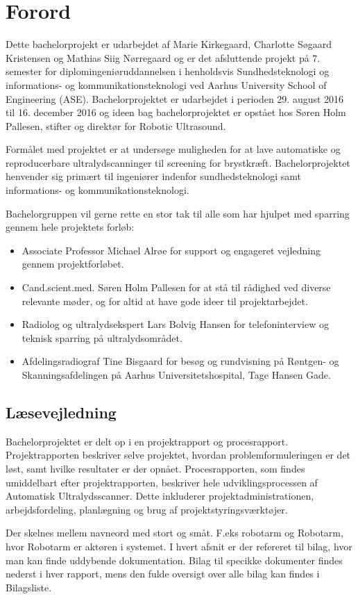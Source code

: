 \chapter{Forord}
Dette bachelorprojekt er udarbejdet af Marie Kirkegaard, Charlotte Søgaard Kristensen og Mathias Siig Nørregaard og er det afsluttende projekt på 7. semester for diplomingeniøruddannelsen i henholdsvis Sundhedsteknologi og informations- og kommunikationsteknologi ved Aarhus University School of Engineering (ASE). Bachelorprojektet er udarbejdet i perioden 29. august 2016 til 16. december 2016 og ideen bag bachelorprojektet er opstået hos Søren Holm Pallesen, stifter og direktør for Robotic Ultrasound. 

Formålet med projektet er at undersøge muligheden for at lave automatiske og reproducerbare ultralydscanninger til screening for brystkræft. Bachelorprojektet henvender sig primært til ingeniører indenfor sundhedsteknologi samt informations- og  kommunikationsteknologi. 

Bachelorgruppen vil gerne rette en stor tak til alle som har hjulpet med sparring gennem hele projektets forløb:

\let\labelitemi\labelitemii
\begin{itemize}
\item Associate Professor Michael Alrøe for support og engageret vejledning gennem projektforløbet.

\item Cand.scient.med. Søren Holm Pallesen for at stå til rådighed ved diverse relevante møder, og for altid at have gode ideer til projektarbejdet.

\item Radiolog og ultralydsekspert Lars Bolvig Hansen for telefoninterview og teknisk sparring på ultralydsområdet.

\item Afdelingsradiograf Tine Bisgaard for besøg og rundvisning på Røntgen- og Skanningsafdelingen på Aarhus Universitetshospital, Tage Hansen Gade. 
\end{itemize}

\section{Læsevejledning} 
Bachelorprojektet er delt op i en projektrapport og procesrapport. Projektrapporten beskriver selve projektet, hvordan problemformuleringen er det løst, samt hvilke resultater er der opnået. Procesrapporten, som findes umiddelbart efter projektrapporten, beskriver hele udviklingsprocessen af Automatisk Ultralydsscanner. Dette inkluderer projektadministrationen, arbejdsfordeling, planlægning og brug af projektstyringsværktøjer. 

Der skelnes mellem navneord med stort og småt. F.eks robotarm og Robotarm, hvor Robotarm er aktøren i systemet.
I hvert afsnit er der refereret til bilag, hvor man kan finde uddybende dokumentation. Bilag til specikke dokumenter findes nederst i hver rapport, mens den fulde oversigt over alle bilag kan findes i Bilagsliste.  
